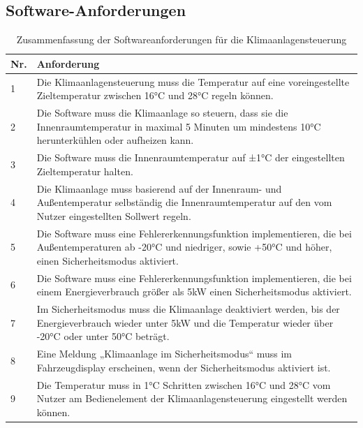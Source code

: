 \documentclass[a4paper,12pt]{article}
\begin{document}
	\subsection{Software-Anforderungen}
	\begin{table}[H]
		\centering
		\renewcommand{\arraystretch}{1.5} %
		\begin{tabular}{|p{1.5cm}|p{13cm}|}
			\hline
			\textbf{Nr.} & \textbf{Anforderung} \\
			\hline
			1 & Die Klimaanlagensteuerung muss die Temperatur auf eine voreingestellte Zieltemperatur zwischen 16°C und 28°C regeln können. \\
			\hline
			2 & Die Software muss die Klimaanlage so steuern, dass sie die Innenraumtemperatur in maximal 5 Minuten um mindestens 10°C herunterkühlen oder aufheizen kann. \\
			\hline
			3 & Die Software muss die Innenraumtemperatur auf ±1°C der eingestellten Zieltemperatur halten. \\
			\hline
			4 & Die Klimaanlage muss basierend auf der Innenraum- und Außentemperatur selbständig die Innenraumtemperatur auf den vom Nutzer eingestellten Sollwert regeln. \\
			\hline
			5 & Die Software muss eine Fehlererkennungsfunktion implementieren, die bei Außentemperaturen ab -20°C und niedriger, sowie +50°C und höher, einen Sicherheitsmodus aktiviert. \\
			\hline
			6 & Die Software muss eine Fehlererkennungsfunktion implementieren, die bei einem Energieverbrauch größer als 5kW einen Sicherheitsmodus aktiviert. \\
			\hline
			7 & Im Sicherheitsmodus muss die Klimaanlage deaktiviert werden, bis der Energieverbrauch wieder unter 5kW und die Temperatur wieder über -20°C oder unter 50°C beträgt. \\
			\hline
			8 & Eine Meldung „Klimaanlage im Sicherheitsmodus“ muss im Fahrzeugdisplay erscheinen, wenn der Sicherheitsmodus aktiviert ist. \\
			\hline
			9 & Die Temperatur muss in 1°C Schritten zwischen 16°C und 28°C vom Nutzer am Bedienelement der Klimaanlagensteuerung eingestellt werden können. \\
			\hline
		\end{tabular}
		\caption{Zusammenfassung der Softwareanforderungen für die Klimaanlagensteuerung}
		\label{tab:softwareanforderungen}
	\end{table}
	
	\newpage
	
\end{document}
